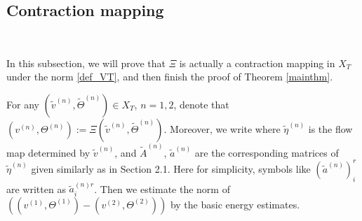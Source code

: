 \documentclass[12pt,a4paper]{amsart}
\numberwithin{equation}{section}
\theoremstyle{plain}
\theoremstyle{definition}
\begin{document}
\vspace{0.3cm}

\subsection{Contraction mapping}~ 

\vspace{0.3cm} 
In this subsection, we will prove that %
$\Xi$ is actually a contraction mapping in $X_T$ under the norm \eqref{def_VT}, and then finish the proof of Theorem \ref{mainthm}.

\vspace{0.3cm}
For any $(\widetilde{v}^{(n)}, \widetilde{\Theta}^{(n)}) \in X_T$, $n=1,2$, denote that $(v^{(n)},\Theta^{(n)}):=\Xi(\widetilde{v}^{(n)}, \widetilde{\Theta}^{(n)})$.
Moreover, we write 
where $\widetilde{\eta}^{(n)}$ is the flow map determined by $\widetilde{v}^{(n)}$, and $\widetilde{A}^{(n)}$, $\widetilde{a}^{(n)}$ are the corresponding matrices of $\widetilde{\eta}^{(n)}$ given similarly as in Section 2.1. Here for simplicity, symbols like  $(\widetilde{a}^{(n)})^r_i$ are written as $\widetilde{a}^{(n)r}_i$. Then we estimate the norm of $((v^{(1)},\Theta^{(1)})-(v^{(2)},\Theta^{(2)}))$ by the basic energy estimates.
\end{document}
